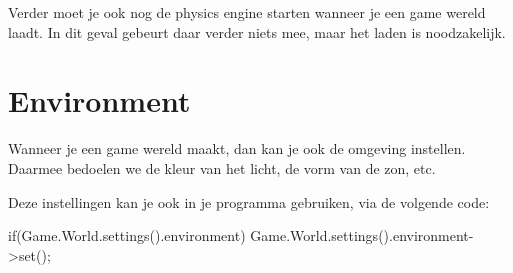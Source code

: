 Verder moet je ook nog de physics engine starten wanneer je een game wereld laadt. In dit geval gebeurt daar verder niets mee, maar het laden is noodzakelijk.

\section{Environment}
Wanneer je een game wereld maakt, dan kan je ook de omgeving instellen. Daarmee bedoelen we de kleur van het licht, de vorm van de zon, etc.

Deze instellingen kan je ook in je programma gebruiken, via de volgende code:

\begin{code}
if(Game.World.settings().environment) {
   Game.World.settings().environment->set();
}
\end{code}

